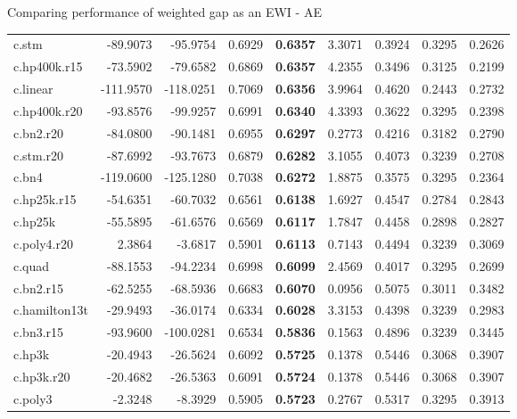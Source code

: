 \documentclass[
  ignorenonframetext,
]{beamer}
\begin{document}
\begin{frame}{Comparing performance of weighted gap as an EWI - AE}
{\begin{tabular}[t]{lrrr>{}rrrrr}
c.stm & -89.9073 & -95.9754 & 0.6929 & \textbf{0.6357} & 3.3071 & 0.3924 & 0.3295 & 0.2626\\
\addlinespace
c.hp400k.r15 & -73.5902 & -79.6582 & 0.6869 & \textbf{0.6357} & 4.2355 & 0.3496 & 0.3125 & 0.2199\\
c.linear & -111.9570 & -118.0251 & 0.7069 & \textbf{0.6356} & 3.9964 & 0.4620 & 0.2443 & 0.2732\\
c.hp400k.r20 & -93.8576 & -99.9257 & 0.6991 & \textbf{0.6340} & 4.3393 & 0.3622 & 0.3295 & 0.2398\\
c.bn2.r20 & -84.0800 & -90.1481 & 0.6955 & \textbf{0.6297} & 0.2773 & 0.4216 & 0.3182 & 0.2790\\
c.stm.r20 & -87.6992 & -93.7673 & 0.6879 & \textbf{0.6282} & 3.1055 & 0.4073 & 0.3239 & 0.2708\\
\addlinespace
c.bn4 & -119.0600 & -125.1280 & 0.7038 & \textbf{0.6272} & 1.8875 & 0.3575 & 0.3295 & 0.2364\\
c.hp25k.r15 & -54.6351 & -60.7032 & 0.6561 & \textbf{0.6138} & 1.6927 & 0.4547 & 0.2784 & 0.2843\\
c.hp25k & -55.5895 & -61.6576 & 0.6569 & \textbf{0.6117} & 1.7847 & 0.4458 & 0.2898 & 0.2827\\
c.poly4.r20 & 2.3864 & -3.6817 & 0.5901 & \textbf{0.6113} & 0.7143 & 0.4494 & 0.3239 & 0.3069\\
c.quad & -88.1553 & -94.2234 & 0.6998 & \textbf{0.6099} & 2.4569 & 0.4017 & 0.3295 & 0.2699\\
\addlinespace
c.bn2.r15 & -62.5255 & -68.5936 & 0.6683 & \textbf{0.6070} & 0.0956 & 0.5075 & 0.3011 & 0.3482\\
c.hamilton13t & -29.9493 & -36.0174 & 0.6334 & \textbf{0.6028} & 3.3153 & 0.4398 & 0.3239 & 0.2983\\
c.bn3.r15 & -93.9600 & -100.0281 & 0.6534 & \textbf{0.5836} & 0.1563 & 0.4896 & 0.3239 & 0.3445\\
c.hp3k & -20.4943 & -26.5624 & 0.6092 & \textbf{0.5725} & 0.1378 & 0.5446 & 0.3068 & 0.3907\\
c.hp3k.r20 & -20.4682 & -26.5363 & 0.6091 & \textbf{0.5724} & 0.1378 & 0.5446 & 0.3068 & 0.3907\\
\addlinespace
c.poly3 & -2.3248 & -8.3929 & 0.5905 & \textbf{0.5723} & 0.2767 & 0.5317 & 0.3295 & 0.3913\\
\bottomrule
\end{tabular}}
\end{frame}
\end{document}
